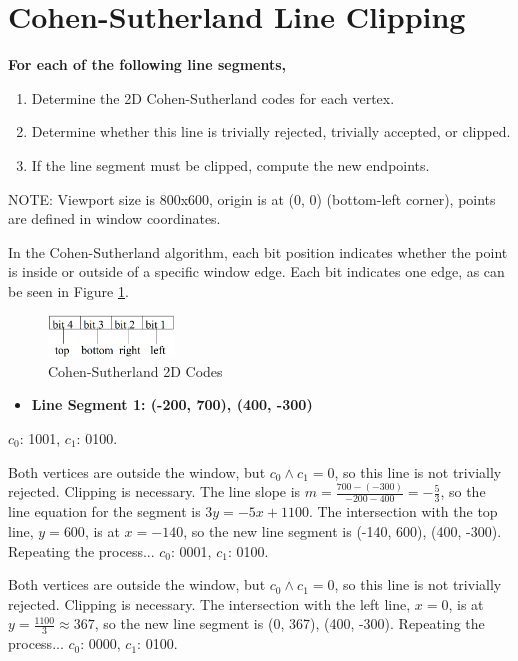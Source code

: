 \documentclass[12pt]{article}
\begin{document}
\section{Cohen-Sutherland Line Clipping}
{\bfseries For each of the following line segments,
\begin{enumerate}
\item Determine the 2D Cohen-Sutherland codes for each vertex.
\item Determine whether this line is trivially rejected, trivially accepted, or clipped.
\item If the line segment must be clipped, compute the new endpoints.
\end{enumerate}
NOTE: Viewport size is 800x600, origin is at (0, 0) (bottom-left corner), points are defined in window coordinates.}

In the Cohen-Sutherland algorithm, each bit position indicates whether the point is inside or outside of a specific window edge. Each bit indicates one edge, as can be seen in Figure \ref{fig:cohen}.

\begin{figure}
    \centering
    \includegraphics[width = 0.3\textwidth]{images/cohen.png}
    \caption{Cohen-Sutherland 2D Codes}
    \label{fig:cohen}
\end{figure}

\begin{itemize}
\item \textbf{ Line Segment 1: (-200, 700), (400, -300)}
\end{itemize}
	$c_0$: 1001, \hspace{1cm} $c_1$: 0100.

	Both vertices are outside the window, but $c_0 \land c_1 = 0$, so this line is not trivially rejected. Clipping is necessary. The line slope is $m=\frac{700-(-300)}{-200-400}=-\frac{5}{3}$, so the line equation for the segment is $3y = -5x + 1100$. The intersection with the top line, $y=600$, is at $x=-140$, so the new line segment is (-140, 600), (400, -300). Repeating the process...
    \bigbreak
 	$c_0$: 0001, \hspace{1cm} $c_1$: 0100.
    
	Both vertices are outside the window, but $c_0 \land c_1 = 0$, so this line is not trivially rejected. Clipping is necessary. The intersection with the left line, $x=0$, is at $y=\frac{1100}{3} \approx 367$, so the new line segment is (0, 367), (400, -300). Repeating the process...
	\bigbreak
	$c_0$: 0000, \hspace{1cm} $c_1$: 0100.
	
\end{document}
